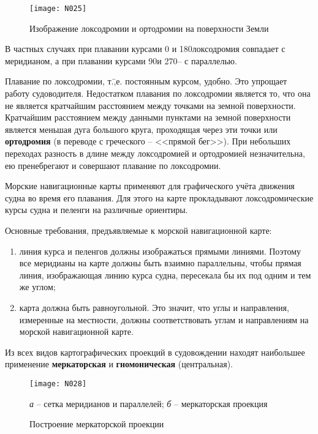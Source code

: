 \begin{figure}[htb]
  \centering{}
  \texttt{[image: N025]}
  \caption{Изображение локсодромии и ортодромии на поверхности Земли}
  \label{fig:N25}
\end{figure}

В частных случаях при плавании курсами 0 и 180\gr локсодромия
совпадает с меридианом, а при плавании курсами 90\gr и 270\gr \--- с
параллелью.

Плавание по локсодромии, т.\=,е. постоянным курсом, удобно. Это
упрощает работу судоводителя. Недостатком плавания по локсодромии
является то, что она не является кратчайшим расстоянием между точками
на земной поверхности. Кратчайшим расстоянием между данными пунктами
на земной поверхности является меньшая дуга большого круга, проходящая
через эти точки или \textbf{ортодромия} (в переводе
с греческого \--- <<прямой бег>>). При небольших переходах разность в
длине между локсодромией и ортодромией незначительна, ею пренебрегают
и совершают плавание по локсодромии.

Морские навигационные карты применяют для графического учёта движения
судна во время его плавания. Для этого на карте прокладывают
локсодромические курсы судна и пеленги на различные ориентиры.

Основные требования, предъявляемые к морской навигационной карте: 

\begin{enumerate}
\item линия курса и пеленгов должны изображаться прямыми
  линиями. Поэтому все меридианы на карте должны быть взаимно
  параллельны, чтобы прямая линия, изображающая линию курса судна,
  пересекала бы их под одним и тем же углом;
\item карта должна быть равноугольной. Это значит, что углы и
  направления, измеренные на местности, должны соответствовать углам и
  направлениям на морской навигационной карте.
\end{enumerate}

Из всех видов картографических проекций в судовождении находят
наибольшее применение \textbf{меркаторская}
и \textbf{гномоническая} (центральная).

\begin{figure*}[htb]
  \centering{}
  \texttt{[image: N028]}
  \caption{Построение меркаторской проекции}
  \label{fig:N28}
  \small
  \centering{}
  \textit{а} \--- сетка меридианов и параллелей; \textit{б} \--- меркаторская проекция
\end{figure*}

